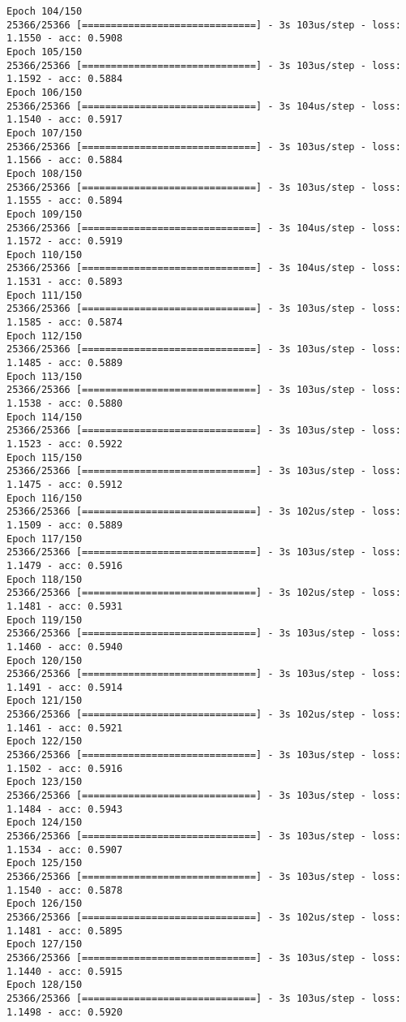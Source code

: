\documentclass[11pt]{article}
\begin{document}
\begin{Verbatim}[commandchars=\\\{\}]
Epoch 104/150
25366/25366 [==============================] - 3s 103us/step - loss: 1.1550 - acc: 0.5908
Epoch 105/150
25366/25366 [==============================] - 3s 103us/step - loss: 1.1592 - acc: 0.5884
Epoch 106/150
25366/25366 [==============================] - 3s 104us/step - loss: 1.1540 - acc: 0.5917
Epoch 107/150
25366/25366 [==============================] - 3s 103us/step - loss: 1.1566 - acc: 0.5884
Epoch 108/150
25366/25366 [==============================] - 3s 103us/step - loss: 1.1555 - acc: 0.5894
Epoch 109/150
25366/25366 [==============================] - 3s 104us/step - loss: 1.1572 - acc: 0.5919
Epoch 110/150
25366/25366 [==============================] - 3s 104us/step - loss: 1.1531 - acc: 0.5893
Epoch 111/150
25366/25366 [==============================] - 3s 103us/step - loss: 1.1585 - acc: 0.5874
Epoch 112/150
25366/25366 [==============================] - 3s 103us/step - loss: 1.1485 - acc: 0.5889
Epoch 113/150
25366/25366 [==============================] - 3s 103us/step - loss: 1.1538 - acc: 0.5880
Epoch 114/150
25366/25366 [==============================] - 3s 103us/step - loss: 1.1523 - acc: 0.5922
Epoch 115/150
25366/25366 [==============================] - 3s 103us/step - loss: 1.1475 - acc: 0.5912
Epoch 116/150
25366/25366 [==============================] - 3s 102us/step - loss: 1.1509 - acc: 0.5889
Epoch 117/150
25366/25366 [==============================] - 3s 103us/step - loss: 1.1479 - acc: 0.5916
Epoch 118/150
25366/25366 [==============================] - 3s 102us/step - loss: 1.1481 - acc: 0.5931
Epoch 119/150
25366/25366 [==============================] - 3s 103us/step - loss: 1.1460 - acc: 0.5940
Epoch 120/150
25366/25366 [==============================] - 3s 103us/step - loss: 1.1491 - acc: 0.5914
Epoch 121/150
25366/25366 [==============================] - 3s 102us/step - loss: 1.1461 - acc: 0.5921
Epoch 122/150
25366/25366 [==============================] - 3s 103us/step - loss: 1.1502 - acc: 0.5916
Epoch 123/150
25366/25366 [==============================] - 3s 103us/step - loss: 1.1484 - acc: 0.5943
Epoch 124/150
25366/25366 [==============================] - 3s 103us/step - loss: 1.1534 - acc: 0.5907
Epoch 125/150
25366/25366 [==============================] - 3s 103us/step - loss: 1.1540 - acc: 0.5878
Epoch 126/150
25366/25366 [==============================] - 3s 102us/step - loss: 1.1481 - acc: 0.5895
Epoch 127/150
25366/25366 [==============================] - 3s 103us/step - loss: 1.1440 - acc: 0.5915
Epoch 128/150
25366/25366 [==============================] - 3s 103us/step - loss: 1.1498 - acc: 0.5920

\end{Verbatim}
\end{document}
